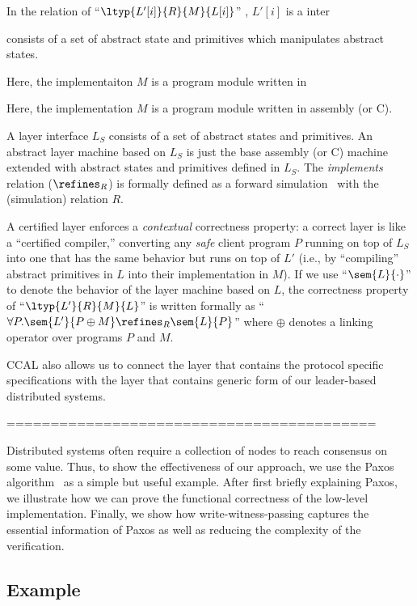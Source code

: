 In the relation of 
``$\ltyp{L'[i]}{R}{M}{L[i]}$'' ,
$L'[i]$ is a inter

consists of a set of abstract state and primitives which manipulates abstract states.

Here, the implementaiton $M$ is a program module written in 


Here, the implementation $M$ is a program module written in
assembly (or C). 


A layer interface $L_S$ consists of a set of abstract
states and primitives. An abstract layer machine based on $L_S$ is just
the base assembly (or C) machine extended with abstract states and
primitives defined in $L_S$.  The {\em implements} relation
($\refines_R$) is formally defined as a forward
simulation~\cite{Lynch95,leroy09,Milner71,Park81} with the
(simulation) relation $R$.

A certified layer enforces a {\em contextual} correctness property: a
correct layer is like a ``certified compiler,'' converting any {\em
  safe} client program $P$ running on top of $L_S$ into one that has the
same behavior but runs on top of $L'$ (i.e., by ``compiling'' abstract
primitives in $L$ into their implementation in $M$).  If we use
``$\sem{L}{\cdot}$'' to denote the behavior of the layer machine based on
$L$, the correctness property of ``$\ltyp{L'}{R}{M}{L}$'' is written
formally as ``$\forall{}P.\sem{L'}{P\oplus{}M} \refines_R \sem{L}{P}$''
where $\oplus$ denotes a linking operator over programs $P$ and $M$.

CCAL also allows us to connect the layer that contains the protocol specific specifications 
with the layer that contains generic form of our leader-based distributed systems. 


==========================================

Distributed systems often require a collection of nodes to reach consensus on some value.
Thus, to show the effectiveness of our approach,
we use the Paxos algorithm~\cite{paxos} as a simple but useful example.
After first briefly explaining Paxos, we illustrate how we can prove the functional correctness of the low-level implementation.
Finally, we show how write-witness-passing captures the essential information of Paxos as well as
reducing the complexity of the verification.

\subsection{Example}

